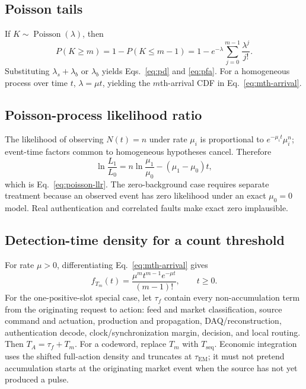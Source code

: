 \documentclass[11pt]{article}
\begin{document}
\subsection{Poisson tails}

If $K\sim\operatorname{Poisson}(\lambda)$, then
\begin{equation}
P(K\ge m)=1-P(K\le m-1)=1-e^{-\lambda}\sum_{j=0}^{m-1}\frac{\lambda^j}{j!}.
\end{equation}
Substituting $\lambda_s+\lambda_b$ or $\lambda_b$ yields Eqs.~\eqref{eq:pd} and \eqref{eq:pfa}. For a homogeneous process over time $t$, $\lambda=\mu t$, yielding the $m$th-arrival CDF in Eq.~\eqref{eq:mth-arrival}.

\subsection{Poisson-process likelihood ratio}

The likelihood of observing $N(t)=n$ under rate $\mu_i$ is proportional to $e^{-\mu_i t}\mu_i^n$; event-time factors common to homogeneous hypotheses cancel. Therefore
\begin{equation}
\ln\frac{L_1}{L_0}=n\ln\frac{\mu_1}{\mu_0}-(\mu_1-\mu_0)t,
\end{equation}
which is Eq.~\eqref{eq:poisson-llr}. The zero-background case requires separate treatment because an observed event has zero likelihood under an exact $\mu_0=0$ model. Real authentication and correlated faults make exact zero implausible.

\subsection{Detection-time density for a count threshold}

For rate $\mu>0$, differentiating Eq.~\eqref{eq:mth-arrival} gives
\begin{equation}
f_{T_m}(t)=\frac{\mu^m t^{m-1}e^{-\mu t}}{(m-1)!},\qquad t\ge0.
\end{equation}
For the one-positive-slot special case, let $\tau_f$ contain every non-accumulation term from the originating request to action: feed and market classification, source command and actuation, production and propagation, DAQ/reconstruction, authentication decode, clock/synchronization margin, decision, and local routing. Then $T_A=\tau_f+T_m$. For a codeword, replace $T_m$ with $T_{\mathrm{seq}}$. Economic integration uses the shifted full-action density and truncates at $\tau_{\mathrm{EM}}$; it must not pretend accumulation starts at the originating market event when the source has not yet produced a pulse.
\end{document}
